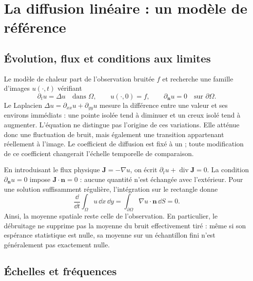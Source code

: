 \section{La diffusion linéaire : un modèle de référence}
\label{sec:heat}

\subsection{Évolution, flux et conditions aux limites}

Le modèle de chaleur part de l'observation bruitée $f$ et recherche une
famille d'images $u(\cdot,t)$ vérifiant
\begin{equation}
 \partial_t u=\Delta u \quad\text{dans }\Omega,\qquad
 u(\cdot,0)=f,\qquad \partial_{\boldsymbol n}u=0
 \quad\text{sur }\partial\Omega.
 \label{eq:heat-continuous}
\end{equation}
Le Laplacien $\Delta u=\partial_{xx}u+\partial_{yy}u$ mesure la différence
entre une valeur et ses environs immédiats : une pointe isolée tend à
diminuer et un creux isolé tend à augmenter. L'équation ne distingue pas
l'origine de ces variations. Elle atténue donc une fluctuation de bruit,
mais également une transition appartenant réellement à l'image.
Le coefficient de diffusion est fixé à un ; toute modification de ce
coefficient changerait l'échelle temporelle de comparaison.

En introduisant le flux physique $\boldsymbol J=-\nabla u$, on écrit
$\partial_t u+\operatorname{div}\boldsymbol J=0$.
La condition $\partial_{\boldsymbol n}u=0$ impose
$\boldsymbol J\cdot\boldsymbol n=0$ : aucune quantité n'est échangée avec
l'extérieur. Pour une solution suffisamment régulière, l'intégration
sur le rectangle donne
\begin{equation}
 \frac{\dd}{\dd t}\int_\Omega u\,\dd x\,\dd y
 =\int_{\partial\Omega}\nabla u\cdot\boldsymbol n\,\dd S=0.
 \label{eq:heat-mass}
\end{equation}
Ainsi, la moyenne spatiale reste celle de l'observation. En particulier,
le débruitage ne supprime pas la moyenne du bruit effectivement tiré :
même si son espérance statistique est nulle, sa moyenne sur un échantillon
fini n'est généralement pas exactement nulle.

\subsection{Échelles et fréquences}

